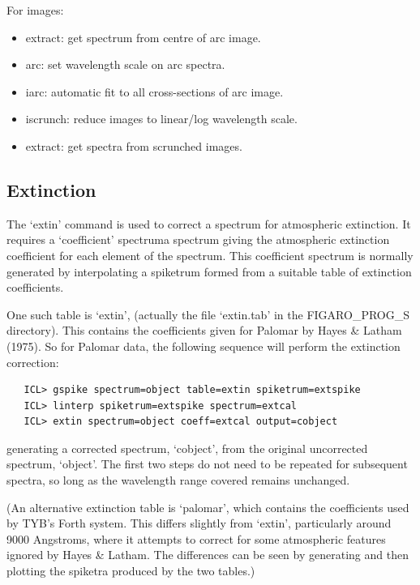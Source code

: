 For images:

\begin{itemize}
\item
   extract:       get spectrum from centre of arc image.
\item
   arc:           set wavelength scale on arc spectra.
\item
   iarc:          automatic fit to all cross-sections of arc image.
\item
   iscrunch:      reduce images to linear/log wavelength scale.
\item
   extract:       get spectra from scrunched images.
\end{itemize}


\subsection{\label{techno9}Extinction}

   The `extin' command is used to correct a spectrum for atmospheric
   extinction.  It requires a `coefficient' spectrum\latorhtm{---}{-}a
   spectrum giving
   the atmospheric extinction coefficient for each element of the
   spectrum.  This coefficient spectrum is normally generated by
   interpolating a spiketrum formed from a suitable table of extinction
   coefficients.

   One such table is `extin', (actually the file `extin.tab' in the
   FIGARO\_PROG\_S directory).  This contains the coefficients given for
   Palomar by Hayes \& Latham (1975).  So for Palomar data, the
   following sequence will perform the extinction correction:

\begin{verbatim}
   ICL> gspike spectrum=object table=extin spiketrum=extspike
   ICL> linterp spiketrum=extspike spectrum=extcal
   ICL> extin spectrum=object coeff=extcal output=cobject
\end{verbatim}

   generating a corrected spectrum, `cobject', from the original
   uncorrected spectrum, `object'.  The first two steps do not need to
   be repeated for subsequent spectra, so long as the wavelength range
   covered remains unchanged.

   (An alternative extinction table is `palomar', which contains the
   coefficients used by TYB's Forth system.  This differs slightly from
   `extin', particularly around 9000 Angstroms, where it attempts to
   correct for some atmospheric features ignored by Hayes \& Latham.
   The differences can be seen by generating and then plotting the
   spiketra produced by the two tables.)

